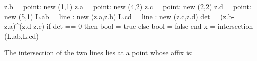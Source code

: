    \begin{tkzelements}
   z.b = point:  new (1,1)
   z.a = point:  new (4,2)
   z.c = point:  new (2,2)
   z.d = point:  new (5,1)
   L.ab = line : new (z.a,z.b)
   L.cd = line : new (z.c,z.d)
    det = (z.b-z.a)^(z.d-z.c)
    if det == 0 then bool = true 
      else bool = false
    end
    x = intersection (L.ab,L.cd)
   \end{tkzelements}

   The intersection of the two lines lies at
    a point whose affix is: 

\vspace{1em}
\hspace{\fill}
   \hspace{\fill} 

\endinput